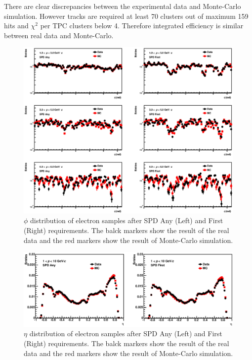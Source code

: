 There are clear discrepancies between the experimental data and Monte-Carlo simulation. 
However tracks are required at least 70 clusters out of maximum 159 hits and $\chi^{2}$ per TPC clusters below 4. 
Therefore integrated efficiency is similar between real data and Monte-Carlo. 

\begin{figure}[!h]
  \centering
  \includegraphics[width=15cm]{chap4/figure/TrackQA/Phi_tof3_tpc2_tpcpi3_MB.eps}
  \caption{$\phi$ distribution of electron samples after SPD Any (Left) and First (Right) requirements. The balck markers show the result of the real data and the red markers show the result of Monte-Carlo simulation.}
  \label{fig_4_qa_phi}
\end{figure}

\begin{figure}[!h]
  \centering
  \includegraphics[width=15cm]{chap4/figure/TrackQA/Eta_tof3_tpc2_tpcpi3_MB.eps}
  \caption{$\eta$ distribution of electron samples after SPD Any (Left) and First (Right) requirements. The balck markers show the result of the real data and the red markers show the result of Monte-Carlo simulation.}
  \label{fig_4_qa_eta}
\end{figure}

